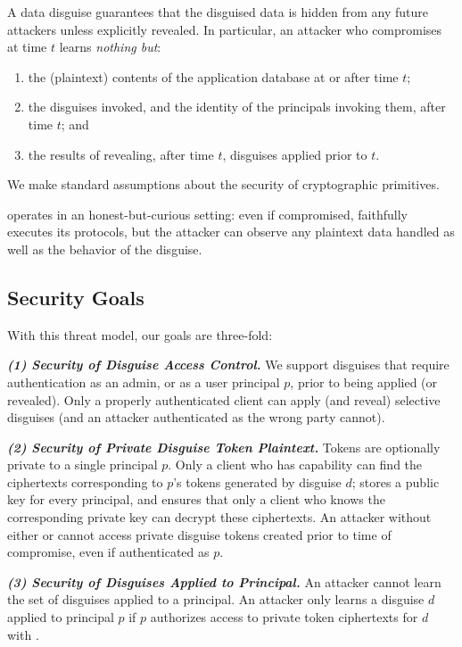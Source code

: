 %
A data disguise guarantees that the disguised data is hidden from any future attackers unless
explicitly revealed.
%
In particular, an attacker who compromises \sys at time $t$ learns \emph{nothing but}:
\begin{enumerate}[nosep]
  \item the (plaintext) contents of the application database at or after time $t$;
  \item the disguises invoked, and the identity of the principals invoking them, after time $t$; and
  \item the results of revealing, after time $t$, disguises applied prior to $t$.
\end{enumerate}
%
We make standard assumptions about the security of cryptographic primitives.
%

%
\sys operates in an honest-but-curious setting: even if compromised, \sys faithfully executes
its protocols, but the attacker can observe any plaintext data handled as well as the behavior
of the disguise.
%

\subsection{Security Goals}

With this threat model, our goals are three-fold: 

\vspace{6pt}\noindent\textbf{\emph{(1) Security of Disguise Access Control.}}
We support disguises that require authentication as an admin, or as a user principal $p$, prior to being applied (or
revealed). Only a properly authenticated client can apply (and reveal) selective disguises
(and an attacker authenticated as the wrong party cannot).

\vspace{6pt}\noindent\textbf{\emph{(2) Security of Private Disguise Token Plaintext.}}
Tokens are optionally private to a single principal $p$. 
Only a client who has capability 
can find the ciphertexts corresponding to $p$'s tokens generated by disguise $d$; 
\sys stores a public key  for every principal, and ensures that 
only a client who knows the corresponding private key  
can decrypt these ciphertexts.
%
An attacker without either  or  cannot access private disguise tokens created prior to time of compromise, even if authenticated as $p$.

\vspace{6pt}\noindent\textbf{\emph{(3) Security of Disguises Applied to Principal.}}
An attacker cannot learn the set of disguises applied to a principal. An attacker only learns a
disguise $d$ applied to principal $p$ if $p$ authorizes access to private token ciphertexts for $d$ with
.

